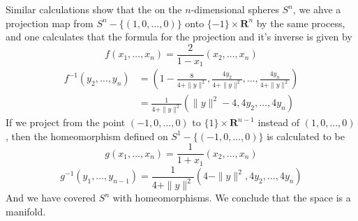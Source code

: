 \begin{example}




    Similar calculations show that the on the $n$-dimensional spheres $S^n$, we ahve a projection map from $S^n - \{ (1,0,\dots,0) \}$ onto $\{ -1 \} \times \mathbf{R}^n$ by the same process, and one calculates that the formula for the projection and it's inverse is given by
    \[ f(x_1, \dots, x_n) = \frac{2}{1 - x_1}(x_2, \dots, x_n) \]
    \begin{align*}
        f^{-1}(y_2, \dots, y_n) &= \left(1 - \frac{8}{4 + \| y \|^2}, \frac{4y_2}{4 + \| y \|^2}, \dots, \frac{4y_n}{4 + \| y \|^2} \right)\\
        &= \frac{1}{4 + \| y \|^2} \left( \| y \|^2 - 4, 4y_2, \dots, 4y_n \right)
    \end{align*}
    If we project from the point $(-1,0,\dots,0)$ to $\{ 1 \} \times \mathbf{R}^{n-1}$ instead of $(1,0,\dots,0)$, then the homeomorphism defined on $S^1 - \{ (-1,0,\dots,0) \}$ is calculated to be
    \[ g(x_1, \dots, x_n) = \frac{1}{1 + x_1}(x_2, \dots, x_n) \]
    \[ g^{-1}(y_1, \dots, y_{n-1}) = \frac{1}{4 + \| y \|^2} \left( 4 - \| y \|^2, 4y_2, \dots, 4y_n \right) \]
    And we have covered $S^n$ with homeomorphisms. We conclude that the space is a manifold.
\end{example}

